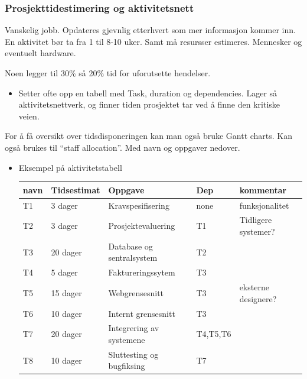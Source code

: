 \documentclass[11pt]{article}
\begin{document}
\subsubsection{Prosjekttidestimering og aktivitetsnett}
\label{sec-5.3.2}

    Vanskelig jobb. Opdateres gjevnlig etterhvert som mer informasjon kommer inn. 
    En aktivitet bør ta fra 1 til 8-10 uker. Samt må resursser estimeres. Mennesker og eventuelt hardware.

    Noen legger til 30\% så 20\% tid for uforutsette hendelser.
\begin{itemize}
\item Setter ofte opp en tabell med Task, duration og dependencies. 
      Lager så aktivitetsnettverk, og finner tiden prosjektet tar ved å finne den kritiske veien.
\end{itemize}
    For å få oversikt over tidsdisponeringen kan man også bruke Gantt charts. Kan også brukes til ``staff allocation''. Med navn og oppgaver nedover.
\begin{itemize}

\item Eksempel på aktivitetstabell\\
\label{sec-5.3.2.1}%
\begin{center}
\begin{tabular}{lllll}
\hline
 navn  &  Tidsestimat  &  Oppgave                    &  Dep       &  kommentar            \\
\hline
 T1    &  3 dager      &  Kravspesifisering          &  none      &  funksjonalitet       \\
 T2    &  3 dager      &  Prosjektevaluering         &  T1        &  Tidligere systemer?  \\
 T3    &  20 dager     &  Database og sentralsystem  &  T2        &                       \\
 T4    &  5 dager      &  Faktureringssytem          &  T3        &                       \\
 T5    &  15 dager     &  Webgrensesnitt             &  T3        &  eksterne designere?  \\
 T6    &  10 dager     &  Internt grensesnitt        &  T3        &                       \\
 T7    &  20 dager     &  Integrering av systemene   &  T4,T5,T6  &                       \\
 T8    &  10 dager     &  Sluttesting og bugfiksing  &  T7        &                       \\
\end{tabular}
\end{center}


    
    
\end{itemize} %
\end{document}
